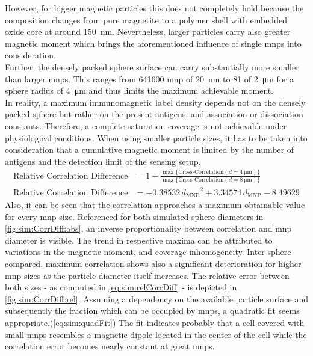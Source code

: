 However, for bigger magnetic particles this does not completely hold because the composition changes from pure magnetite to a polymer shell with embedded oxide core at around \SI{150}{\nano\meter}. Nevertheless, larger particles carry also greater magnetic moment which brings the aforementioned influence of single \glspl{mnp} into consideration. \\ 
Further, the densely packed sphere surface can carry substantially more smaller than larger \glspl{mnp}. This ranges from \num{641600} \gls{mnp} of \SI{20}{\nano\meter} to \num{81} of \SI{2}{\micro\meter} for a sphere radius of \SI{4}{\micro\meter} and thus limits the maximum achievable moment. \\
In reality, a maximum immunomagnetic label density depends not on the densely packed sphere but rather on the present antigens, and association or dissociation constants. Therefore, a complete saturation coverage is not achievable under physiological conditions. When using smaller particle sizes, it has to be taken into consideration that a cumulative magnetic moment is limited by the number of antigens and the detection limit of the sensing setup.
\begin{align}
	\text{Relative\ Correlation\ Difference} &= 1- \frac{\max\{\text{Cross-Correlation}(d=\SI{4}{\micro\meter})\}}{\max\{\text{Cross-Correlation}(d = \SI{8}{\micro\meter})\}} \label{eq:sim:relCorrDiff}\\
	\text{Relative\ Correlation\ Difference} &= \num{-0,38532} \, {d_\text{MNP}}^2 + \num{3,34574} \, d_\text{MNP} - \num{8,49629} \label{eq:sim:quadFit}
\end{align}
Also, it can be seen that the correlation approaches a maximum obtainable value for every \gls{mnp} size. Referenced for both simulated sphere diameters in \cref{fig:sim:CorrDiff:abs}, an inverse proportionality between correlation and \gls{mnp} diameter is visible. The trend in respective maxima can be attributed to variations in the magnetic moment, and coverage inhomogeneity. \clearpage
Inter-sphere compared, maximum correlation shows also a significant deterioration for higher \gls{mnp} sizes as the particle diameter itself increases. The relative error between both sizes - as computed in \cref{eq:sim:relCorrDiff} -  is depicted in \cref{fig:sim:CorrDiff:rel}. Assuming a dependency on the available particle surface and subsequently the fraction which can be occupied by \glspl{mnp}, a quadratic fit seems appropriate.(\cref{eq:sim:quadFit}) The fit indicates probably that a cell covered with small \glspl{mnp} resembles a magnetic dipole located in the center of the cell while the correlation error becomes nearly constant at great \glspl{mnp}.


